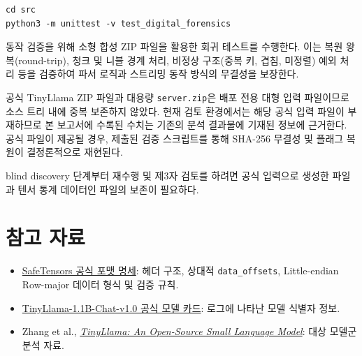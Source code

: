 \documentclass[10pt,a4paper]{article}
\begin{document}
\begin{lstlisting}
cd src
python3 -m unittest -v test_digital_forensics
\end{lstlisting}

동작 검증을 위해 소형 합성 ZIP 파일을 활용한 회귀 테스트를 수행한다. 이는 복원 왕복(round-trip), 청크 및 니블 경계 처리, 비정상 구조(중복 키, 겹침, 미정렬) 예외 처리 등을 검증하여 파서 로직과 스트리밍 동작 방식의 무결성을 보장한다.

공식 TinyLlama ZIP 파일과 대용량 \texttt{server.zip}은 배포 전용 대형 입력 파일이므로 소스 트리 내에 중복 보존하지 않았다. 현재 검토 환경에서는 해당 공식 입력 파일이 부재하므로 본 보고서에 수록된 수치는 기존의 분석 결과물에 기재된 정보에 근거한다. 공식 파일이 제공될 경우, 제출된 검증 스크립트를 통해 SHA-256 무결성 및 플래그 복원이 결정론적으로 재현된다.

blind discovery 단계부터 재수행 및 제3자 검토를 하려면 공식 입력으로 생성한  파일과 텐서 통계 데이터인  파일의 보존이 필요하다.

\section{참고 자료}

\begin{itemize}
  \item \href{https://github.com/huggingface/safetensors#format}
    {SafeTensors 공식 포맷 명세}: 헤더 구조, 상대적 \texttt{data\_offsets}, Little-endian Row-major 데이터 형식 및 검증 규칙.
  \item \href{https://huggingface.co/TinyLlama/TinyLlama-1.1B-Chat-v1.0}
    {TinyLlama-1.1B-Chat-v1.0 공식 모델 카드}: 로그에 나타난 모델 식별자 정보.
  \item Zhang et al.,
    \href{https://arxiv.org/abs/2401.02385}
    {\emph{TinyLlama: An Open-Source Small Language Model}}: 대상 모델군 분석 자료.
\end{itemize}
\end{document}
